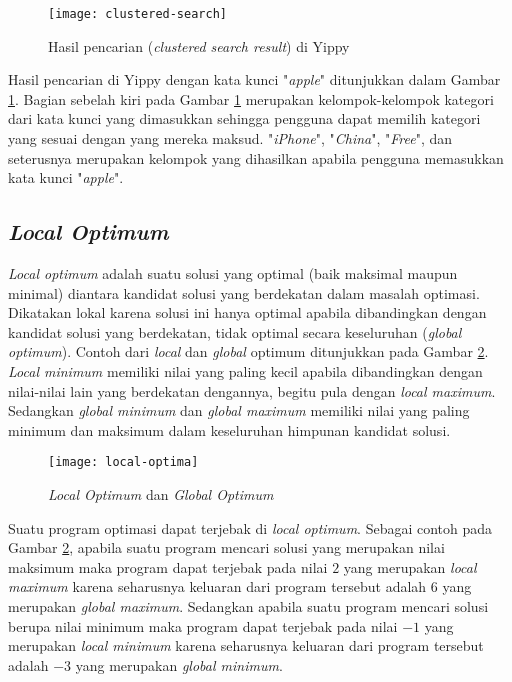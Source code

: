 \begin{figure}[h]
	\centering
	\texttt{[image: clustered-search]}
	\caption{Hasil pencarian (\textit{clustered search result}) di Yippy}
	\label{fig:yippy}
\end{figure}

Hasil pencarian di Yippy dengan kata kunci "\textit{apple}" ditunjukkan dalam Gambar \ref{fig:yippy}. Bagian sebelah kiri pada Gambar \ref{fig:yippy} merupakan kelompok-kelompok kategori dari kata kunci yang dimasukkan sehingga pengguna dapat memilih kategori yang sesuai dengan yang mereka maksud. "\textit{iPhone}", "\textit{China}", "\textit{Free}", dan seterusnya merupakan kelompok yang dihasilkan apabila pengguna memasukkan kata kunci "\textit{apple}".

\subsection{\textit{Local Optimum}}
\textit{Local optimum} adalah suatu solusi yang optimal (baik maksimal maupun minimal) diantara kandidat solusi yang berdekatan dalam masalah optimasi. Dikatakan lokal karena solusi ini hanya optimal apabila dibandingkan dengan kandidat solusi yang berdekatan, tidak optimal secara keseluruhan (\textit{global optimum}). Contoh dari \textit{local} dan \textit{global} optimum ditunjukkan pada Gambar \ref{fig:optima}. \textit{Local minimum} memiliki nilai yang paling kecil apabila dibandingkan dengan nilai-nilai lain yang berdekatan dengannya, begitu pula dengan \textit{local maximum}. Sedangkan \textit{global minimum} dan \textit{global maximum} memiliki nilai yang paling minimum dan maksimum dalam keseluruhan himpunan kandidat solusi.

\begin{figure}[h]
	\begin{center}
		\texttt{[image: local-optima]}
		\caption{\textit{Local Optimum} dan \textit{Global Optimum}}
		\label{fig:optima}
	\end{center}
\end{figure}

Suatu program optimasi dapat terjebak di \textit{local optimum}. Sebagai contoh pada Gambar \ref{fig:optima}, apabila suatu program mencari solusi yang merupakan nilai maksimum maka program dapat terjebak pada nilai $2$ yang merupakan \textit{local maximum} karena seharusnya keluaran dari program tersebut adalah $6$ yang merupakan \textit{global maximum}. Sedangkan apabila suatu program mencari solusi berupa nilai minimum maka program dapat terjebak pada nilai $-1$ yang merupakan \textit{local minimum} karena seharusnya keluaran dari program tersebut adalah $-3$ yang merupakan \textit{global minimum}.

